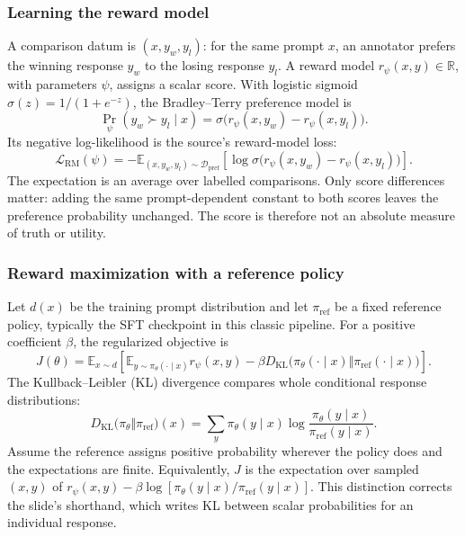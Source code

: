 \documentclass[11pt,a4paper]{article}
\numberwithin{equation}{section}
\numberwithin{figure}{section}
\numberwithin{table}{section}
\newcommand{\R}{\mathbb{R}}
\begin{document}
\subsubsection{Learning the reward model}
A comparison datum is $(x,y_w,y_l)$: for the same prompt $x$, an annotator prefers the winning response $y_w$ to the losing response $y_l$. A reward model $r_\psi(x,y)\in\R$, with parameters $\psi$, assigns a scalar score. With logistic sigmoid $\sigma(z)=1/(1+e^{-z})$, the Bradley--Terry preference model is
\begin{equation}
\Pr_\psi(y_w\succ y_l\mid x)
=\sigma\bigl(r_\psi(x,y_w)-r_\psi(x,y_l)\bigr).
\end{equation}
Its negative log-likelihood is the source's reward-model loss:
\begin{equation}\label{eq:rmloss}
\mathcal L_{\mathrm{RM}}(\psi)
=-\mathbb E_{(x,y_w,y_l)\sim\mathcal D_{\mathrm{pref}}}
\left[\log\sigma\bigl(r_\psi(x,y_w)-r_\psi(x,y_l)\bigr)\right].
\end{equation}
The expectation is an average over labelled comparisons. Only score differences matter: adding the same prompt-dependent constant to both scores leaves the preference probability unchanged. The score is therefore not an absolute measure of truth or utility.

\subsubsection{Reward maximization with a reference policy}
Let $d(x)$ be the training prompt distribution and let $\pi_{\mathrm{ref}}$ be a fixed reference policy, typically the SFT checkpoint in this classic pipeline. For a positive coefficient $\beta$, the regularized objective is
\begin{equation}\label{eq:rlhfobj}
J(\theta)=\mathbb E_{x\sim d}\left[
\mathbb E_{y\sim\pi_\theta(\cdot\mid x)}r_\psi(x,y)
-\beta D_{\mathrm{KL}}\bigl(\pi_\theta(\cdot\mid x)\Vert\pi_{\mathrm{ref}}(\cdot\mid x)\bigr)
\right].
\end{equation}
The Kullback--Leibler (KL) divergence compares whole conditional response distributions:
\begin{equation}\label{eq:sequencekl}
D_{\mathrm{KL}}\bigl(\pi_\theta\Vert\pi_{\mathrm{ref}}\bigr)(x)
=\sum_y\pi_\theta(y\mid x)\log\frac{\pi_\theta(y\mid x)}{\pi_{\mathrm{ref}}(y\mid x)}.
\end{equation}
Assume the reference assigns positive probability wherever the policy does and the expectations are finite. Equivalently, $J$ is the expectation over sampled $(x,y)$ of $r_\psi(x,y)-\beta\log[\pi_\theta(y\mid x)/\pi_{\mathrm{ref}}(y\mid x)]$. This distinction corrects the slide's shorthand, which writes KL between scalar probabilities for an individual response.
\end{document}
